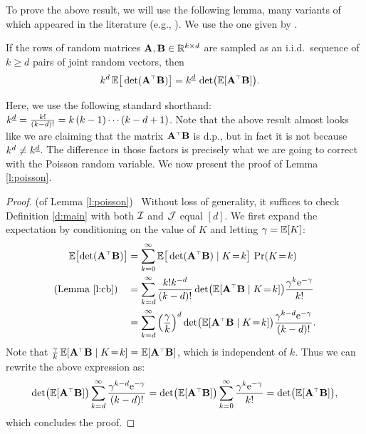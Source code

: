 \documentclass[11pt]{article}
\begin{document}
To prove the above result, we will use the following
lemma, many variants of which appeared in the literature
(e.g., \cite{expected-generalized-variance}). We use the one given by
\cite{correcting-bias}.
\begin{lemma}\label{l:cb}
If the rows of random matrices $\mathbf A,\mathbf B\in\mathbb R^{k\times d}$
  are sampled as an i.i.d.~sequence of $k\geq d$ pairs of joint random vectors, then
\begin{align}
  k^d\,\E \big[\det(\A^\top\B)\big]
  &= \ktd\,\det\!\big(\E[\A^\top\B]\big).
     \end{align}
   \end{lemma}
Here, we use the following standard shorthand: ${k^{\underline{d}}} =
\frac{k!}{(k-d)!} = k\,(k-1)\dotsm(k-d+1)$. Note that the above result
almost looks like we are claiming that the matrix $\A^\top\B$ is d.p.,
but in fact it is not because $k^d\neq {k^{\underline{d}}}$. The difference
in those factors is precisely what we are going to correct with the
Poisson random variable. We now present the proof of Lemma
\ref{l:poisson}.
\begin{proof} (of Lemma \ref{l:poisson}) \
Without loss of generality, it suffices to check Definition \ref{d:main} with both $\mathcal I$ and
$\mathcal{J}$ equal $[d]$. We first expand the expectation by
conditioning on the value of $K$ and letting $\gamma=\mathbb E[K]$:
    \begin{align*}
      \E\big[\!\det(\A^\top\B)\big]
      &= \sum_{k=0}^\infty
\E\big[\det(\A^\top\B)\mid K\!=\!k\big]\
\Pr(K\!=\!k)\\
      \text{(Lemma \ref{l:cb})}
      \quad&=
        \sum_{k=d}^\infty\frac{k! k^{-d}}{(k-d)!}\det\!\big(\E[\A^\top\B\mid
        K\!=\!k]\big)
        \frac{\gamma^k\ee^{-\gamma}}{k!}\\
      &=\sum_{k=d}^\infty
\Big(\frac\gamma k\Big)^d\det\!\big(\E[\A^\top\B\mid K\!=\!k]\big)
        \frac{\gamma^{k-d}\ee^{-\gamma}}{(k-d)!}.
    \end{align*}
    Note that $\frac\gamma k\,\E[\A^\top\B\mid K\!=\!k]=\E[\A^\top\B]$,
    which is independent of $k$. Thus we can rewrite the above
    expression as:
    \begin{align*}
\det\!\big(\E[\A^\top\B]\big)\sum_{k=d}^\infty\frac{\gamma^{k-d}\ee^{-\gamma}}{(k-d)!}
      =
      \det\!\big(\E[\A^\top\B]\big)\sum_{k=0}^\infty
      \frac{\gamma^{k}\ee^{-\gamma}}{k!}=\det\!\big(\E[\A^\top\B]\big),
    \end{align*}
    which concludes the proof.
\end{proof}
\end{document}
